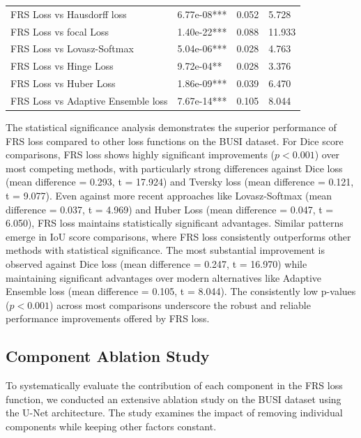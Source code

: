 \documentclass[review]{elsarticle}
\begin{document}
\begin{table}[ht]
\begin{tabular}{llll}
		FRS Loss vs Hausdorff loss         & 6.77e-08***      & 0.052              & 5.728           \\
		FRS Loss vs focal Loss             & 1.40e-22***      & 0.088              & 11.933          \\
		FRS Loss vs Lovasz-Softmax         & 5.04e-06***      & 0.028              & 4.763           \\
		FRS Loss vs Hinge Loss             & 9.72e-04**       & 0.028              & 3.376           \\
		FRS Loss vs Huber Loss             & 1.86e-09***      & 0.039              & 6.470           \\
		FRS Loss vs Adaptive Ensemble loss & 7.67e-14***      & 0.105              & 8.044           \\
		\hline
	\end{tabular}
\end{table}

The statistical significance analysis demonstrates the superior performance of FRS loss compared to other loss functions on the BUSI dataset. For Dice score comparisons, FRS loss shows highly significant improvements (\(p < 0.001\)) over most competing methods, with particularly strong differences against Dice loss (mean difference = 0.293, t = 17.924) and Tversky loss (mean difference = 0.121, t = 9.077). Even against more recent approaches like Lovasz-Softmax (mean difference = 0.037, t = 4.969) and Huber Loss (mean difference = 0.047, t = 6.050), FRS loss maintains statistically significant advantages. Similar patterns emerge in IoU score comparisons, where FRS loss consistently outperforms other methods with statistical significance. The most substantial improvement is observed against Dice loss (mean difference = 0.247, t = 16.970) while maintaining significant advantages over modern alternatives like Adaptive Ensemble loss (mean difference = 0.105, t = 8.044). The consistently low p-values (\(p < 0.001\)) across most comparisons underscore the robust and reliable performance improvements offered by FRS loss.

\subsection{Component Ablation Study}
To systematically evaluate the contribution of each component in the FRS loss function, we conducted an extensive ablation study on the BUSI dataset using the U-Net architecture. The study examines the impact of removing individual components while keeping other factors constant.
\end{document}
